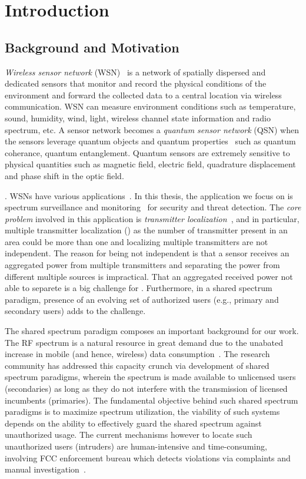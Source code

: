 \chapter{Introduction}
\label{chap:intro}

\section{Background and Motivation}

\emph{Wireless sensor network} (WSN)~\cite{wsn_survey} is a network of spatially dispersed and dedicated sensors that monitor and record the 
physical conditions of the environment and forward the collected data to a central location via wireless communication.
WSN can measure environment conditions such as temperature, sound, humidity, wind, light, wireless channel state information and radio spectrum, etc.
A sensor network becomes a \emph{quantum sensor network} (QSN) when the sensors leverage quantum objects and quantum properties~\cite{RevModPhys.quantumsensing}
such as quantum coherance, quantum entanglement.
Quantum sensors are extremely sensitive to physical quantities such as magnetic field, electric field, quadrature displacement
and phase shift in the optic field.

. WSNs have various applications~\cite{tsn17-water,sensys10-health,mobicom03-sensor}.
In this thesis, the application we focus on is spectrum surveillance and monitoring~\cite{arani2018} for security and threat detection.
The \emph{core problem} involved in this application is \emph{transmitter localization}~\cite{ton-sensorselect,caitao2023qsn}, and in particular, multiple transmitter localization (\mtl) as 
the number of transmitter present in an area could be more than one and localizing multiple transmitters are not independent.
The reason for being not independent is that a sensor receives an aggregated power from multiple transmitters and separating 
the power from different multiple sources is impractical.
That an aggregated received power not able to separete is a big challenge for \mtl.
Furthermore, in a shared spectrum paradigm, presence of an evolving set of authorized users 
(e.g., primary and secondary users) adds to the challenge.

The shared spectrum paradigm composes an important background for our \mtl work.
The RF spectrum is a natural resource in great demand due to the unabated increase in mobile (and hence, wireless) data consumption~\cite{Jeffrey14}. 
The research community has addressed this capacity crunch via development of shared spectrum paradigms, wherein the spectrum 
is made available to unlicensed users (secondaries) as long as they do not interfere with the transmission of licensed incumbents (primaries).
The fundamental objective behind such shared spectrum paradigms is to maximize spectrum utilization,
the viability of such systems depends on the ability to effectively guard the shared spectrum against unauthorized usage. 
The current mechanisms however to locate such unauthorized users (intruders) are human-intensive and time-consuming, 
involving FCC enforcement bureau which detects violations via complaints and manual investigation~\cite{mobicom17-splot}. 

